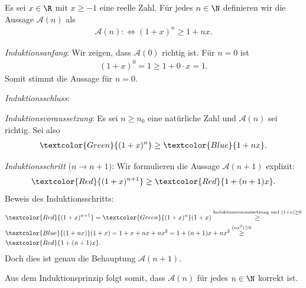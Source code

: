 \clearpage
\begin{myanswer}[myexercise:0206]
	Es sei $x\in\R$ mit $x\geq -1$ eine reelle Zahl. Für jedes $n\in\N$ definieren wir die Aussage $\mathcal{A}(n)$ als
	\begin{align*}
		\mathcal{A}(n) :\iff (1+x)^n\geq 1+nx.
	\end{align*}
	\begin{aenum}
		\item \textit{Induktionsanfang}: Wir zeigen, dass $\mathcal{A}(0)$ richtig ist. Für $n=0$ ist
		\begin{align*}
			(1+x)^0 = 1 \geq 1 + 0\cdot x = 1.
		\end{align*}
		Somit stimmt die Aussage für $n=0$.
		\item \textit{Induktionsschluss}:
		\begin{renum}
			\item \textit{Induktionsvoraussetzung}: Es sei $n\geq n_0$ eine natürliche Zahl und $\mathcal{A}(n)$ sei richtig. Sei also
			\begin{align*}
				\textcolor{Green}{(1+x)^n} \geq \textcolor{Blue}{1+nx}.
			\end{align*}
			\item \textit{Induktionsschritt} ($n\to n+1)$: Wir formulieren die Aussage $\mathcal{A}(n+1)$ explizit:
				\begin{align*}
					\textcolor{Red}{(1+x)^{n+1}} \geq \textcolor{Red}{1 + (n+1)x}.
				\end{align*}
				Beweis des Induktionsschritts:
				\begin{align*}
					 & \textcolor{Red}{(1+x)^{n+1}} = \textcolor{Green}{(1+x)^n} (1+x) \stackrel{\text{Induktionsvoraussetzung und }(1+x)\geq 0}{\geq} \\
					 & \textcolor{Blue}{(1+nx)}(1+x) = 1+x+nx+nx^2 = 1+(n+1)x + nx^2 \stackrel{(nx^2)\geq 0}{\geq}                                     \\
					 & \textcolor{Red}{1 + (n+1)x}.
				\end{align*}
				Doch dies ist genau die Behauptung $\mathcal{A}(n+1)$.
		\end{renum}
	\end{aenum}
	Aus dem Induktionsprinzip folgt somit, dass $\mathcal{A}(n)$ für jedes $n\in\N$ korrekt ist.
\end{myanswer}

